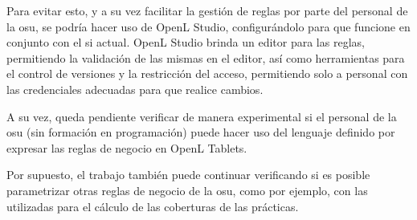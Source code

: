 Para evitar esto, y a su vez facilitar la gestión de reglas por parte del personal de la {osu}, se podría hacer uso de OpenL Studio, configurándolo para que funcione en conjunto con el \acrshort{si} actual. 
OpenL Studio brinda un editor para las reglas, permitiendo la validación de las mismas en el editor, así como herramientas para el control de versiones y la restricción del acceso, permitiendo solo a personal con las credenciales adecuadas para que realice cambios.

A su vez, queda pendiente verificar de manera experimental si el personal de la \acrshort{osu} (sin formación en programación) puede hacer uso del lenguaje definido por expresar las reglas de negocio en OpenL Tablets. 

Por supuesto, el trabajo también puede continuar verificando si es posible parametrizar otras reglas de negocio de la \acrshort{osu}, como por ejemplo, con las utilizadas para el cálculo de las coberturas de las prácticas.
